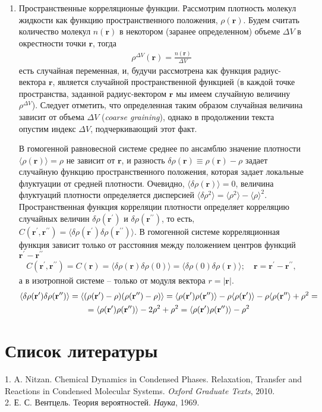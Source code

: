 \documentclass[14pt]{extarticle}
\newcommand{\vr}{\mathbf{r}}
\newcommand{\pr}{\prime}
\begin{document}
\begin{enumerate}
		\item Пространственные корреляционые функции. Рассмотрим плотность молекул жидкости как функцию пространственного положения, $\rho(\vr)$. Будем считать количество молекул $n(\vr)$ в некотором (заранее определенном) объеме $\Delta V$ в окрестности точки $\vr$, тогда
\begin{gather}
	\rho^{\Delta V} (\vr) = \frac{n(\vr)}{\Delta V} \label{1.194}
\end{gather}
есть случайная переменная, и, будучи рассмотрена как функция радиус-вектора $\vr$, является случайной пространственной функцией (в каждой точке пространства, заданной радиус-вектором $\vr$ мы имеем случайную величину $\rho^{\Delta V}$). Следует отметить, что определенная таким образом случайная величина зависит от объема $\Delta V$ (\textit{coarse graining}), однако в продолжении текста опустим индекс $\Delta V$, подчеркивающий этот факт. \par
В гомогенной равновесной системе среднее по ансамблю значение плотности $\langle \rho(\vr) \rangle = \rho$ не зависит от $\vr$, и разность $\delta \rho(\vr) \equiv \rho(\vr) - \rho$ задает случайную функцию пространственного положения, которая задает локальные флуктуации от средней плотности. Очевидно, $\langle \delta \rho(\vr) \rangle = 0$, величина флуктуаций плотности определяется дисперсией $\langle \delta \rho^2 \rangle = \langle \rho^2 \rangle - \langle \rho \rangle^2$. Пространственная функция корреляции плотности определяет корреляцию случайных величин $\delta \rho(\vr^\prime)$ и $\delta \rho (\vr^{\prime\prime})$, то есть, $C(\vr^\prime, \vr^{\prime\prime}) = \langle \delta \rho(\vr^\prime) \delta \rho(\vr^{\prime\prime}) \rangle$. В гомогенной системе корреляционная функция зависит только от расстояния между положением центров функций $\vr^\prime - \vr^{\prime\prime}$
\begin{gather}
		C( \vr^\pr, \vr^{\pr\pr}) = C(\vr) = \langle \delta \rho(\vr) \delta \rho(0) \rangle = \langle \delta \rho(0) \delta \rho(\vr) \rangle; \quad \vr = \vr^\pr - \vr^{\pr\pr}, \label{1.195}
\end{gather}
а в изотропной системе -- только от модуля вектора $r = | \vr |$.
\begin{gather}
		\langle \delta \rho(\vr^\pr) \delta \rho(\vr^{\pr\pr}) \rangle = \langle (\rho(\vr^\pr) - \rho)(\rho(\vr^{\pr\pr}) - \rho) \rangle = \langle \rho(\vr^\pr) \rho(\vr^{\pr\pr}) \rangle - \rho \langle \rho(\vr^\prime) \rangle - \rho \langle \rho(\vr^{\pr\pr} \rangle + \rho^2 = \notag \\ 
	=	\langle \rho(\vr^\pr) \rho(\vr^{\pr\pr}) \rangle - 2\rho^2 + \rho^2 = \langle \rho(\vr^\pr) \rho(\vr^{\pr\pr}) \rangle -  \rho^2
\end{gather}
\end{enumerate}

\section{Список литературы}
1. A. Nitzan. Chemical Dynamics in Condensed Phases. Relaxation, Transfer and Reactions in Condensed Molecular Systems. \textit{Oxford Graduate Texts}, 2010. \\
2. Е. С. Вентцель. Теория вероятностей. \textit{Наука}, 1969.
\end{document}
